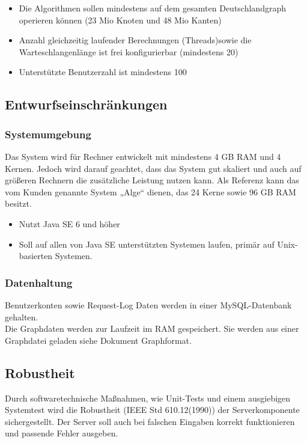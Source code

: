 \documentclass[a4paper,10pt,titlepage,parskip=true]{article}
\begin{document}
\begin{itemize}
 \item Die Algorithmen sollen mindestens auf dem gesamten Deutschlandgraph operieren können (23 Mio Knoten und 48 Mio Kanten)
 \item Anzahl gleichzeitig laufender Berechnungen (Threads)sowie die Warteschlangenlänge ist frei konfigurierbar (mindestens 20)
 \item Unterstützte Benutzerzahl ist mindestens 100 
\end{itemize}

\subsection{Entwurfseinschränkungen}
\subsubsection{Systemumgebung}
\label{Systemumgebung}
Das System wird für Rechner entwickelt mit mindestens 4 GB RAM und 4 Kernen. Jedoch wird darauf geachtet, dass das System gut skaliert und auch auf größeren Rechnern die zusätzliche Leistung nutzen kann.
Als Referenz kann das vom Kunden genannte System „Alge“ dienen, das 24 Kerne sowie 96 GB RAM besitzt.

\begin {itemize}
 \item Nutzt Java SE 6 und höher
 \item Soll auf allen von Java SE unterstützten Systemen laufen, primär auf Unix-basierten Systemen.
\end {itemize}
\subsubsection{Datenhaltung}
\label{datenhaltung}
Benutzerkonten sowie Request-Log Daten werden in einer MySQL-Datenbank gehalten.\\
Die Graphdaten werden zur Laufzeit im RAM gespeichert. Sie werden aus einer Graphdatei geladen siehe Dokument Graphformat.

\subsection{Robustheit}
Durch softwaretechnische Maßnahmen, wie Unit-Tests und einem ausgiebigen Systemtest wird die Robustheit (IEEE Std 610.12(1990)) der Serverkomponente sichergestellt. Der Server soll auch bei falschen Eingaben korrekt funktionieren und passende Fehler ausgeben.
\end{document}
